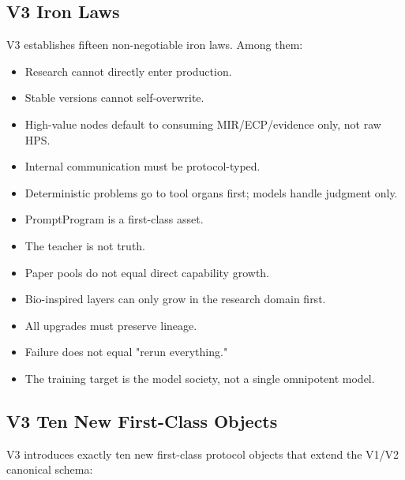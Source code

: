 \documentclass[12pt,a4paper]{article}
\begin{document}
\subsection{V3 Iron Laws}


V3 establishes fifteen non-negotiable iron laws. Among them:
\begin{itemize}
  \item Research cannot directly enter production.
  \item Stable versions cannot self-overwrite.
  \item High-value nodes default to consuming MIR/ECP/evidence only, not raw HPS.
  \item Internal communication must be protocol-typed.
  \item Deterministic problems go to tool organs first; models handle judgment only.
  \item PromptProgram is a first-class asset.
  \item The teacher is not truth.
  \item Paper pools do not equal direct capability growth.
  \item Bio-inspired layers can only grow in the research domain first.
  \item All upgrades must preserve lineage.
  \item Failure does not equal "rerun everything."
  \item The training target is the model society, not a single omnipotent model.
\end{itemize}


\subsection{V3 Ten New First-Class Objects}


V3 introduces exactly ten new first-class protocol objects that extend the V1/V2 canonical schema:
\end{document}
